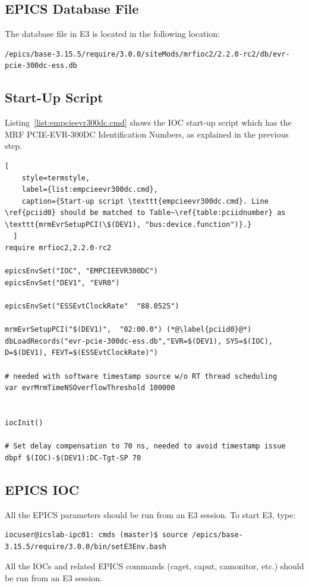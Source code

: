 \documentclass[11pt
  , a4paper
  , article
  , oneside
  , showtrims
]{memoir}
\begin{document}
{\subsection{EPICS Database File}
The database file in E3 is located in the following location:
\begin{lstlisting}[style=termstyle]
/epics/base-3.15.5/require/3.0.0/siteMods/mrfioc2/2.2.0-rc2/db/evr-pcie-300dc-ess.db
\end{lstlisting}

\subsection{Start-Up Script}
Listing~\ref{list:empcieevr300dc.cmd} shows the IOC start-up script which has the MRF PCIE-EVR-300DC Identification Numbers, as explained in the previous step.

\begin{lstlisting}[
    style=termstyle,
    label={list:empcieevr300dc.cmd},
    caption={Start-up script \texttt{empcieevr300dc.cmd}. Line \ref{pciid0} should be matched to Table~\ref{table:pciidnumber} as \texttt{mrmEvrSetupPCI(\$(DEV1), "bus:device.function")}.}
  ]
require mrfioc2,2.2.0-rc2

epicsEnvSet("IOC", "EMPCIEEVR300DC")
epicsEnvSet("DEV1", "EVR0")

epicsEnvSet("ESSEvtClockRate"  "88.0525")

mrmEvrSetupPCI("$(DEV1)",  "02:00.0") (*@\label{pciid0}@*)
dbLoadRecords("evr-pcie-300dc-ess.db","EVR=$(DEV1), SYS=$(IOC), D=$(DEV1), FEVT=$(ESSEvtClockRate)")

# needed with software timestamp source w/o RT thread scheduling
var evrMrmTimeNSOverflowThreshold 100000


iocInit()

# Set delay compensation to 70 ns, needed to avoid timestamp issue
dbpf $(IOC)-$(DEV1):DC-Tgt-SP 70
\end{lstlisting}

\subsection{EPICS IOC}
All the EPICS parameters should be run from an E3 session. To start E3, type:
\begin{lstlisting}[style=termstyle]
iocuser@icslab-ipc01: cmds (master)$ source /epics/base-3.15.5/require/3.0.0/bin/setE3Env.bash
\end{lstlisting}
All the IOCs and related EPICS commands (caget, caput, camonitor, etc.) should be run from an E3 session.

}
\end{document}
